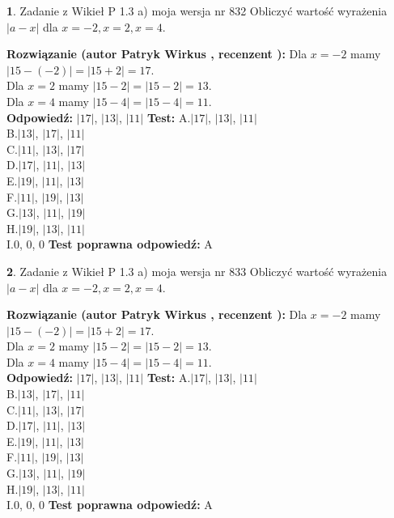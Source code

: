 \documentclass[12pt, a4paper]{article}
\theoremstyle{definition} %
\newtheorem{zad}{}
\newcommand{\zadStart}[1]{\begin{zad}#1\newline}
\newcommand{\zadStop}{\end{zad}}
\newcommand{\rozwStart}[2]{\noindent \textbf{Rozwiązanie (autor #1 , recenzent #2): }\newline}
\newcommand{\rozwStop}{\newline}
\newcommand{\odpStart}{\noindent \textbf{Odpowiedź:}\newline}
\newcommand{\odpStop}{\newline}
\newcommand{\testStart}{\noindent \textbf{Test:}\newline}
\newcommand{\testStop}{\newline}
\newcommand{\kluczStart}{\noindent \textbf{Test poprawna odpowiedź:}\newline}
\newcommand{\kluczStop}{\newline}
\begin{document}
\zadStart{Zadanie z Wikieł P 1.3 a) moja wersja nr 832}
Obliczyć wartość wyrażenia $|a - x|$ dla $x=-2,x=2,x=4$.
\zadStop
\rozwStart{Patryk Wirkus}{}
Dla $x = -2$ mamy $|15 - (-2)| = |15 + 2| = 17$.\\
Dla $x = 2$ mamy $|15 - 2| = |15 - 2| = 13$.\\
Dla $x = 4$ mamy $|15 - 4| = |15 - 4| = 11$.\\
\rozwStop
\odpStart
$|17|$, $|13|$, $|11|$
\odpStop
\testStart
A.$|17|$, $|13|$, $|11|$\\
B.$|13|$, $|17|$, $|11|$\\
C.$|11|$, $|13|$, $|17|$\\
D.$|17|$, $|11|$, $|13|$\\
E.$|19|$, $|11|$, $|13|$\\
F.$|11|$, $|19|$, $|13|$\\
G.$|13|$, $|11|$, $|19|$\\
H.$|19|$, $|13|$, $|11|$\\
I.$0$, $0$, $0$
\testStop
\kluczStart
A
\kluczStop



\zadStart{Zadanie z Wikieł P 1.3 a) moja wersja nr 833}
Obliczyć wartość wyrażenia $|a - x|$ dla $x=-2,x=2,x=4$.
\zadStop
\rozwStart{Patryk Wirkus}{}
Dla $x = -2$ mamy $|15 - (-2)| = |15 + 2| = 17$.\\
Dla $x = 2$ mamy $|15 - 2| = |15 - 2| = 13$.\\
Dla $x = 4$ mamy $|15 - 4| = |15 - 4| = 11$.\\
\rozwStop
\odpStart
$|17|$, $|13|$, $|11|$
\odpStop
\testStart
A.$|17|$, $|13|$, $|11|$\\
B.$|13|$, $|17|$, $|11|$\\
C.$|11|$, $|13|$, $|17|$\\
D.$|17|$, $|11|$, $|13|$\\
E.$|19|$, $|11|$, $|13|$\\
F.$|11|$, $|19|$, $|13|$\\
G.$|13|$, $|11|$, $|19|$\\
H.$|19|$, $|13|$, $|11|$\\
I.$0$, $0$, $0$
\testStop
\kluczStart
A
\kluczStop
\end{document}
